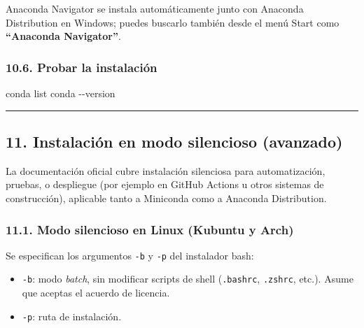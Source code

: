 \documentclass[
  doc,
  floatsintext,
  longtable,
  a4paper,
  nolmodern,
  notxfonts,
  notimes,
  12pt,
  colorlinks=true,linkcolor=blue,citecolor=blue,urlcolor=blue]{apa7}
\newenvironment{Shaded}{\begin{snugshade}}{\end{snugshade}}
\newcommand{\AttributeTok}[1]{\textcolor[rgb]{0.40,0.45,0.13}{#1}}
\newcommand{\FunctionTok}[1]{\textcolor[rgb]{0.28,0.35,0.67}{#1}}
\newcommand{\NormalTok}[1]{\textcolor[rgb]{0.00,0.23,0.31}{#1}}
\newcommand{\VariableTok}[1]{\textcolor[rgb]{0.07,0.07,0.07}{#1}}
\providecommand{\tightlist}{%
  \setlength{\itemsep}{0pt}\setlength{\parskip}{0pt}}
\begin{document}
Anaconda Navigator se instala automáticamente junto con Anaconda
Distribution en Windows; puedes buscarlo también desde el menú Start
como \textbf{``Anaconda Navigator''}.

\subsubsection{10.6. Probar la
instalación}\label{probar-la-instalaciuxf3n-2}

\begin{Shaded}
\begin{Highlighting}[]
\NormalTok{conda list}
\NormalTok{conda {-}}\AttributeTok{{-}version}
\end{Highlighting}
\end{Shaded}

\begin{center}\rule{0.5\linewidth}{0.5pt}\end{center}

\subsection{11. Instalación en modo silencioso
(avanzado)}\label{instalaciuxf3n-en-modo-silencioso-avanzado}

La documentación oficial cubre instalación silenciosa para
automatización, pruebas, o despliegue (por ejemplo en GitHub Actions u
otros sistemas de construcción), aplicable tanto a Miniconda como a
Anaconda Distribution.

\subsubsection{11.1. Modo silencioso en Linux (Kubuntu y
Arch)}\label{modo-silencioso-en-linux-kubuntu-y-arch}

Se especifican los argumentos \texttt{-b} y \texttt{-p} del instalador
bash:

\begin{itemize}
\tightlist
\item
  \texttt{-b}: modo \emph{batch}, sin modificar scripts de shell
  (\texttt{.bashrc}, \texttt{.zshrc}, etc.). Asume que aceptas el
  acuerdo de licencia.
\item
  \texttt{-p}: ruta de instalación.
\end{itemize}

\begin{Shaded}
\end{Shaded}
\end{document}
